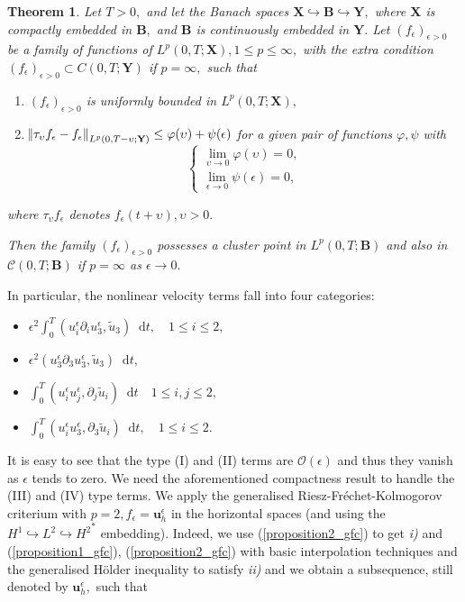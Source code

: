 \documentclass[12pt]{report}
\newtheorem{theorem}{Theorem}
\numberwithin{theorem}{chapter}
\numberwithin{corollary}{chapter}
\numberwithin{lemma}{chapter}
\numberwithin{remark}{chapter}
\numberwithin{definition}{chapter}
\numberwithin{prop}{chapter}
\newcommand*\diff{\mathop{}\!\mathrm{d}}
\begin{document}
\begin{theorem} \label{compactnessbyperturbation}
Let $T>0,$ and let the Banach spaces $\mathbf{X} \hookrightarrow \mathbf{B} \hookrightarrow \mathbf{Y},$ where $\mathbf{X}$ is compactly embedded in $\mathbf{B},$ and $\mathbf{B}$ is continuously embedded in $\mathbf{Y}.$ Let $(f_\epsilon)_{\epsilon>0}$ be a family of functions of $L^p (0,T; \mathbf{X}), 1 \leq p \leq \infty,$ with the extra condition $(f_\epsilon)_{\epsilon>0} \subset C (0,T; \mathbf{Y})$ if $p = \infty,$ such that
\begin{enumerate}
  \item $(f_\epsilon)_{\epsilon>0}$ is uniformly bounded in $L^p (0,T; \mathbf{X}),$
  \item $\norm{\tau_\upsilon f_\epsilon - f_\epsilon}_{L^p(0,T-\upsilon; \mathbf{Y})} \leq \varphi(\upsilon) + \psi(\epsilon)$ for a given pair of functions $\varphi, \psi$ with
  $$
    \begin{cases}
      \lim_{\upsilon \to 0} \varphi(\upsilon) = 0,\\
      \lim_{\epsilon \to 0} \psi(\epsilon) = 0,
    \end{cases}
  $$
  \end{enumerate}
  
where $\tau_\upsilon f_\epsilon$ denotes $f_\epsilon (t+\upsilon), \upsilon > 0.$
  
Then the family $(f_\epsilon)_{\epsilon>0}$ possesses a cluster point in $L^p (0,T; \mathbf{B})$ and also in $\mathcal{C}(0,T; \mathbf{B})$ if $p = \infty$ as $\epsilon \to 0.$
\end{theorem}

In particular, the nonlinear velocity terms fall into four categories:

\begin{itemize}
  \item[(I)] $\epsilon^2 \int_0^T (u_i^\epsilon \partial_i u_3^\epsilon, \tilde{u}_3) \diff t, \quad 1 \leq i \leq 2,$
  \item[(II)] $\epsilon^2 (u_3^\epsilon \partial_3 u_3^\epsilon, \tilde{u}_3) \diff t,$
  \item[(III)] $\int_0^T (u_i^\epsilon u_j^\epsilon, \partial_j \tilde{u}_i) \diff t \quad 1 \leq i, j \leq 2,$
  \item[(IV)] $\int_0^T (u_i^\epsilon u_3^\epsilon, \partial_3 \tilde{u}_i) \diff t, \quad 1 \leq i \leq 2.$
\end{itemize}

It is easy to see that the type (I) and (II) terms are $\mathcal{O}(\epsilon)$ and thus they vanish as $\epsilon$ tends to zero. We need the aforementioned compactness result to handle the (III) and (IV) type terms. We apply the generalised Riesz-Fr\'echet-Kolmogorov criterium with $p=2, f_\epsilon = \mathbf{u}_h^\epsilon$ in the horizontal spaces (and using the $H^1 \hookrightarrow L^2 \hookrightarrow {H^2}^*$ embedding). Indeed, we use (\ref{proposition2_gfc}) to get \textit{i)} and (\ref{proposition1_gfc}), (\ref{proposition2_gfc}) with basic interpolation techniques and the generalised H\"older inequality to satisfy \textit{ii)} and we obtain a subsequence, still denoted by $\mathbf{u}_h^\epsilon,$ such that
\end{document}
